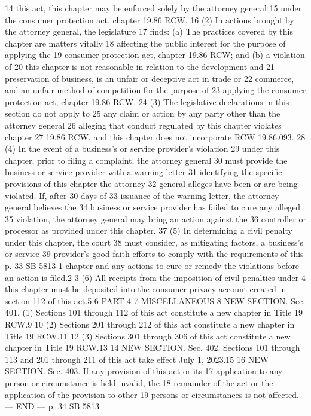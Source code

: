 14 this act, this chapter may be enforced solely by the attorney general
15 under the consumer protection act, chapter 19.86 RCW.
16 (2) In actions brought by the attorney general, the legislature
17 finds: (a) The practices covered by this chapter are matters vitally
18 affecting the public interest for the purpose of applying the
19 consumer protection act, chapter 19.86 RCW; and (b) a violation of
20 this chapter is not reasonable in relation to the development and
21 preservation of business, is an unfair or deceptive act in trade or
22 commerce, and an unfair method of competition for the purpose of
23 applying the consumer protection act, chapter 19.86 RCW.
24 (3) The legislative declarations in this section do not apply to
25 any claim or action by any party other than the attorney general
26 alleging that conduct regulated by this chapter violates chapter
27 19.86 RCW, and this chapter does not incorporate RCW 19.86.093.
28 (4) In the event of a business's or service provider's violation
29 under this chapter, prior to filing a complaint, the attorney general
30 must provide the business or service provider with a warning letter
31 identifying the specific provisions of this chapter the attorney
32 general alleges have been or are being violated. If, after 30 days of
33 issuance of the warning letter, the attorney general believes the
34 business or service provider has failed to cure any alleged
35 violation, the attorney general may bring an action against the
36 controller or processor as provided under this chapter.
37 (5) In determining a civil penalty under this chapter, the court
38 must consider, as mitigating factors, a business's or service
39 provider's good faith efforts to comply with the requirements of this
p. 33 SB 5813
1 chapter and any actions to cure or remedy the violations before an
action is filed.2
3 (6) All receipts from the imposition of civil penalties under
4 this chapter must be deposited into the consumer privacy account
created in section 112 of this act.5
6 PART 4
7 MISCELLANEOUS
8 NEW SECTION. Sec. 401. (1) Sections 101 through 112 of this act
constitute a new chapter in Title 19 RCW.9
10 (2) Sections 201 through 212 of this act constitute a new chapter
in Title 19 RCW.11
12 (3) Sections 301 through 306 of this act constitute a new chapter
in Title 19 RCW.13
14 NEW SECTION. Sec. 402. Sections 101 through 113 and 201 through
211 of this act take effect July 1, 2023.15
16 NEW SECTION. Sec. 403. If any provision of this act or its
17 application to any person or circumstance is held invalid, the
18 remainder of the act or the application of the provision to other
19 persons or circumstances is not affected.
--- END ---
p. 34 SB 5813